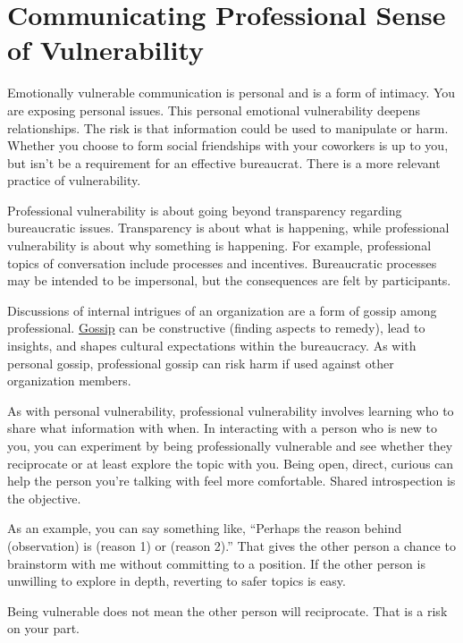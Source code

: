 \section{Communicating Professional Sense of Vulnerability\label{sec:professional-vulnerability}}

Emotionally vulnerable communication is personal and is a form of intimacy. You are exposing personal issues. This personal emotional vulnerability deepens relationships. The risk is that information could be used to manipulate or harm. Whether you choose to form social friendships with your coworkers is up to you, but isn't be a requirement for an effective bureaucrat. There is a more relevant practice of vulnerability.

Professional vulnerability is about going beyond transparency regarding bureaucratic issues. Transparency is about what is happening, while professional vulnerability is about why something is happening. For example, professional topics of conversation include processes and incentives. Bureaucratic processes may be intended to be impersonal, but the consequences are felt by participants.


Discussions of internal intrigues of an organization are a form of gossip among professional. \href{https://en.wikipedia.org/wiki/Gossip}{Gossip} 
can be constructive (finding aspects to remedy),  lead to insights, and shapes cultural expectations within the bureaucracy. As with personal gossip, professional gossip can risk harm if used against other organization members. 

As with personal vulnerability, professional vulnerability involves learning who to share what information with when. In interacting with a person who is new to you, you can experiment by being professionally vulnerable and see whether they reciprocate or at least explore the topic with you. Being open, direct, curious can help the person you're talking with feel more comfortable. Shared introspection is the objective. 

As an example, you can say something like, ``Perhaps the reason behind (observation) is (reason 1) or (reason 2).'' That gives the other person a chance to brainstorm with me without committing to a position. If the other person is unwilling to explore in depth, reverting to safer topics is easy.

Being vulnerable does not mean the other person will reciprocate. That is a risk on your part. 